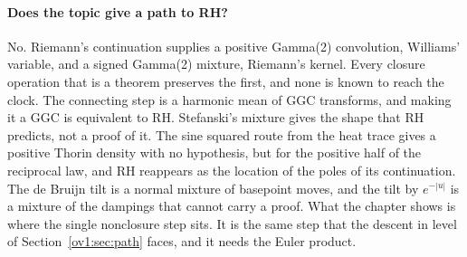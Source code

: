 \paragraph{Does the topic give a path to RH?} No. Riemann's continuation supplies a positive Gamma(2) convolution, Williams' variable, and a signed Gamma(2) mixture, Riemann's kernel. Every closure operation that is a theorem preserves the first, and none is known to reach the clock. The connecting step is a harmonic mean of GGC transforms, and making it a GGC is equivalent to RH. Stefanski's mixture gives the shape that RH predicts, not a proof of it. The sine squared route from the heat trace gives a positive Thorin density with no hypothesis, but for the positive half of the reciprocal law, and RH reappears as the location of the poles of its continuation. The de Bruijn tilt is a normal mixture of basepoint moves, and the tilt by $e^{-|u|}$ is a mixture of the dampings that cannot carry a proof. What the chapter shows is where the single nonclosure step sits. It is the same step that the descent in level of Section~\ref{ov1:sec:path} faces, and it needs the Euler product.
